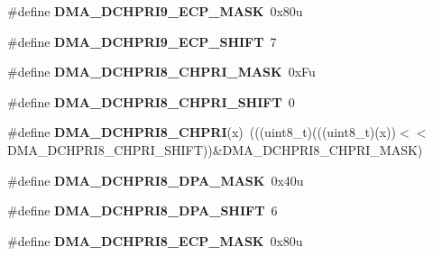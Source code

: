 \begin{DoxyCompactItemize}
\item 
\#define {\bfseries D\+M\+A\+\_\+\+D\+C\+H\+P\+R\+I9\+\_\+\+E\+C\+P\+\_\+\+M\+A\+SK}~0x80u\hypertarget{group__DMA__Register__Masks_gadc613e99a97309c8ca4526630226676a}{}\label{group__DMA__Register__Masks_gadc613e99a97309c8ca4526630226676a}

\item 
\#define {\bfseries D\+M\+A\+\_\+\+D\+C\+H\+P\+R\+I9\+\_\+\+E\+C\+P\+\_\+\+S\+H\+I\+FT}~7\hypertarget{group__DMA__Register__Masks_gafabc45696d405cdb5aa873607867d490}{}\label{group__DMA__Register__Masks_gafabc45696d405cdb5aa873607867d490}

\item 
\#define {\bfseries D\+M\+A\+\_\+\+D\+C\+H\+P\+R\+I8\+\_\+\+C\+H\+P\+R\+I\+\_\+\+M\+A\+SK}~0x\+Fu\hypertarget{group__DMA__Register__Masks_ga44efc2d24b92142a4be64cae219e4313}{}\label{group__DMA__Register__Masks_ga44efc2d24b92142a4be64cae219e4313}

\item 
\#define {\bfseries D\+M\+A\+\_\+\+D\+C\+H\+P\+R\+I8\+\_\+\+C\+H\+P\+R\+I\+\_\+\+S\+H\+I\+FT}~0\hypertarget{group__DMA__Register__Masks_gae9ee24ab908f6a1a3551e5ae4bf0bcad}{}\label{group__DMA__Register__Masks_gae9ee24ab908f6a1a3551e5ae4bf0bcad}

\item 
\#define {\bfseries D\+M\+A\+\_\+\+D\+C\+H\+P\+R\+I8\+\_\+\+C\+H\+P\+RI}(x)~(((uint8\+\_\+t)(((uint8\+\_\+t)(x))$<$$<$D\+M\+A\+\_\+\+D\+C\+H\+P\+R\+I8\+\_\+\+C\+H\+P\+R\+I\+\_\+\+S\+H\+I\+FT))\&D\+M\+A\+\_\+\+D\+C\+H\+P\+R\+I8\+\_\+\+C\+H\+P\+R\+I\+\_\+\+M\+A\+SK)\hypertarget{group__DMA__Register__Masks_gaa2368732a13adfa212beaf45f72e6ee0}{}\label{group__DMA__Register__Masks_gaa2368732a13adfa212beaf45f72e6ee0}

\item 
\#define {\bfseries D\+M\+A\+\_\+\+D\+C\+H\+P\+R\+I8\+\_\+\+D\+P\+A\+\_\+\+M\+A\+SK}~0x40u\hypertarget{group__DMA__Register__Masks_ga65d73b58fdc371391eba07e59bec1292}{}\label{group__DMA__Register__Masks_ga65d73b58fdc371391eba07e59bec1292}

\item 
\#define {\bfseries D\+M\+A\+\_\+\+D\+C\+H\+P\+R\+I8\+\_\+\+D\+P\+A\+\_\+\+S\+H\+I\+FT}~6\hypertarget{group__DMA__Register__Masks_gafb506e73fabed6916d50868ca9189bf4}{}\label{group__DMA__Register__Masks_gafb506e73fabed6916d50868ca9189bf4}

\item 
\#define {\bfseries D\+M\+A\+\_\+\+D\+C\+H\+P\+R\+I8\+\_\+\+E\+C\+P\+\_\+\+M\+A\+SK}~0x80u\hypertarget{group__DMA__Register__Masks_ga853ddcde9ef1ca6dcdb2a5742bb4c081}{}\label{group__DMA__Register__Masks_ga853ddcde9ef1ca6dcdb2a5742bb4c081}


\end{DoxyCompactItemize}
